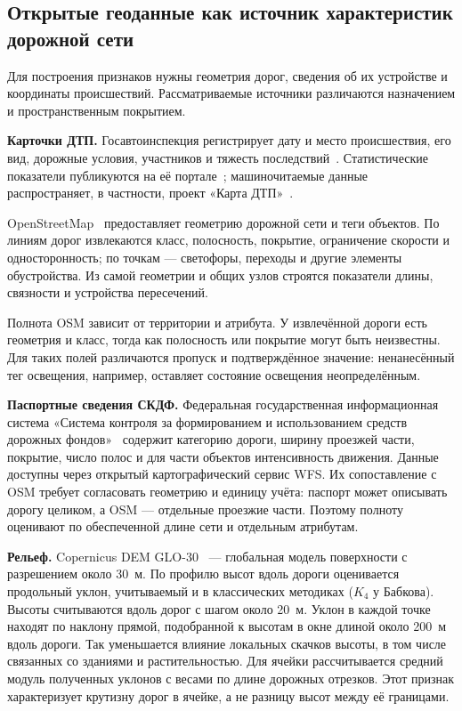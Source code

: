 \documentclass[coursework]{SCWorks}
\begin{document}
\subsection{Открытые геоданные как источник характеристик дорожной сети}

Для построения признаков нужны геометрия дорог, сведения об их
устройстве и координаты происшествий. Рассматриваемые источники
различаются назначением и пространственным покрытием.

\textbf{Карточки ДТП.} Госавтоинспекция регистрирует дату и место
происшествия, его вид, дорожные условия, участников и тяжесть
последствий~\cite{odm2015}. Статистические показатели публикуются
на её портале~\cite{gibddstat}; машиночитаемые данные распространяет,
в частности, проект «Карта ДТП»~\cite{dtpstat}.

OpenStreetMap~\cite{osm} предоставляет геометрию дорожной сети и
теги объектов. По линиям дорог извлекаются класс, полосность,
покрытие, ограничение скорости и односторонность; по точкам ---
светофоры, переходы и другие элементы обустройства. Из самой геометрии
и общих узлов строятся показатели длины, связности и устройства
пересечений.

Полнота OSM зависит от территории и атрибута. У извлечённой дороги
есть геометрия и класс, тогда как полосность или покрытие могут
быть неизвестны. Для таких полей различаются пропуск и подтверждённое
значение: ненанесённый тег освещения, например, оставляет состояние
освещения неопределённым.

\textbf{Паспортные сведения СКДФ.} Федеральная государственная
информационная система «Система контроля за формированием и
использованием средств дорожных фондов»~\cite{skdf} содержит
категорию дороги, ширину проезжей части, покрытие, число полос
и для части объектов интенсивность движения. Данные доступны через
открытый картографический сервис WFS. Их сопоставление с OSM
требует согласовать геометрию и единицу учёта: паспорт может описывать
дорогу целиком, а OSM --- отдельные проезжие части. Поэтому полноту
оценивают по обеспеченной длине сети и отдельным атрибутам.

\textbf{Рельеф.} Copernicus DEM GLO-30~\cite{copernicusdem} ---
глобальная модель поверхности с разрешением около 30~м. По профилю
высот вдоль дороги оценивается продольный уклон, учитываемый и в
классических методиках ($K_4$ у Бабкова). Высоты считываются вдоль
дорог с шагом около 20~м. Уклон в каждой точке находят по наклону
прямой, подобранной к высотам в окне длиной около 200~м вдоль дороги.
Так уменьшается влияние локальных скачков высоты, в том числе
связанных со зданиями и растительностью. Для ячейки рассчитывается
средний модуль полученных уклонов с весами по длине дорожных отрезков.
Этот признак характеризует крутизну дорог в ячейке, а не разницу высот
между её границами.
\end{document}
